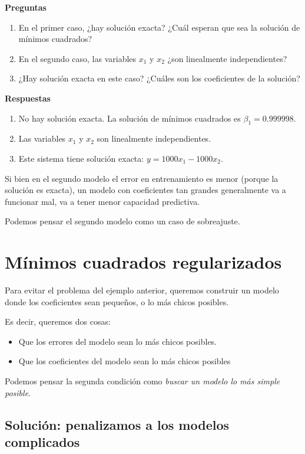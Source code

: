 \documentclass[a4paper]{article}
\begin{document}
\textbf{Preguntas}
\begin{enumerate}
\item En el primer caso, ¿hay solución exacta? ¿Cuál esperan que sea la solución de mínimos cuadrados?
\item En el segundo caso, las variables $x_1$ y $x_2$ ¿son linealmente independientes?
\item ¿Hay solución exacta en este caso? ¿Cuáles son los coeficientes de la solución?
\end{enumerate}

\textbf{Respuestas}

\begin{enumerate}
\item No hay solución exacta. La solución de mínimos cuadrados es $\beta_1 = 0.999998$.
\item Las variables $x_1$ y $x_2$ son linealmente independientes.
\item Este sistema tiene solución exacta: $y = 1000 x_1 - 1000 x_2$.
\end{enumerate}

Si bien en el segundo modelo el error en entrenamiento es menor (porque la solución es exacta), un modelo con coeficientes tan grandes generalmente va a funcionar mal, va a tener menor capacidad predictiva.

Podemos pensar el segundo modelo como un caso de sobreajuste.


\section{Mínimos cuadrados regularizados}

Para evitar el problema del ejemplo anterior, queremos construir un modelo donde los coeficientes sean pequeños, o lo más chicos posibles.

Es decir, queremos dos cosas:
\begin{itemize}
\item Que los errores del modelo sean lo más chicos posibles.
\item Que los coeficientes del modelo sean lo más chicos posibles
\end{itemize}

Podemos pensar la segunda condición como \emph{buscar un modelo lo más simple posible}.

\subsection{Solución: penalizamos a los modelos complicados}
\end{document}
